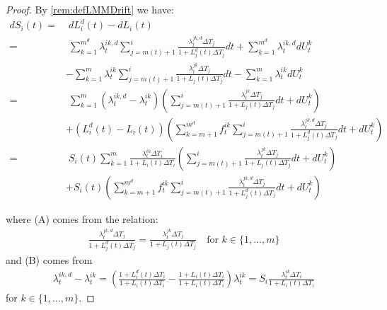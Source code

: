 \documentclass[12pt]{article}
\begin{document}
	\begin{proof}
		By \cref{rem:defLMMDrift} we have:
		\begin{align*}
			dS_i(t) =&\; dL^d_i(t) - dL_i(t)\\
			=&\; \sum_{k=1}^{m^d}\lambda^{i k,d}_t \sum_{j=m(t)+1}^{i}\frac{\lambda^{j k,d}_t \Delta T_j}{1 + L^d_j(t) \Delta T_j} dt + \sum_{k=1}^{m^d}\lambda^{i k,d}_tdU^k_t 
			\\
			&- \sum_{k=1}^{m}\lambda^{i k}_t \sum_{j=m(t)+1}^{i}\frac{\lambda^{j k}_t \Delta T_j}{1 + L_j(t) \Delta T_j} dt - \sum_{k=1}^{m}\lambda^{i k}_t dU^k_t\\
			=&\; \sum_{k=1}^{m}\left(\lambda^{i k,d}_t - \lambda^{i k}_t\right)\left( \sum_{j=m(t)+1}^{i}\frac{\lambda^{j k}_t \Delta T_j}{1 + L_j(t) \Delta T_j} dt + dU^k_t\right)
			\tag{A}\\
			&+ \left(L^d_i(t) - L_i(t)\right)\left(\sum_{k=m + 1}^{m^d}f^{i k}_t \sum_{j=m(t)+1}^{i}\frac{\lambda^{j k, d}_t \Delta T_j}{1 + L^d_j(t) \Delta T_j} dt + dU^k_t\right)\\
			=&\; S_i(t)\sum_{k=1}^{m}\frac{\lambda^{i k}_t \Delta T_i}{1 + L_i(t)\Delta T_i}\left( \sum_{j=m(t)+1}^{i}\frac{\lambda^{j k}_t \Delta T_j}{1 + L_j(t) \Delta T_j} dt + dU^k_t\right)
			\tag{B}\\
			&+ S_i(t)\left(\sum_{k=m + 1}^{m^d}f^{i k}_t \sum_{j=m(t)+1}^{i}\frac{\lambda^{j k, d}_t \Delta T_j}{1 + L^d_j(t) \Delta T_j} dt + dU^k_t\right)
		\end{align*}
		
		where (A) comes from the relation:
		\begin{align*}
			\frac{\lambda^{j k, d}_t \Delta T_j}{1 + L^d_j(t) \Delta T_j} = \frac{\lambda^{j k}_t \Delta T_j}{1 + L_j(t) \Delta T_j} \quad \text{for } k \in \{1, ..., m\}
		\end{align*}
		and (B) comes from
		\begin{align*}
			\lambda^{i k,d}_t - \lambda^{i k}_t = \left(\frac{1 + L^d_i(t) \Delta T_i}{1 + L_i(t)\Delta T_i} - \frac{1 + L_i(t) \Delta T_i}{1 + L_i(t)\Delta T_i}\right)\lambda^{i k}_t = S_i \frac{\lambda^{i k}_t \Delta T_i}{1 + L_i(t) \Delta T_i}
		\end{align*}
		for $k \in \{1, ..., m\}$.
	\end{proof}
	
\end{document}
